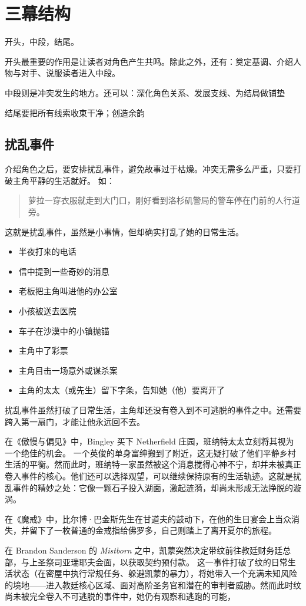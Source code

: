 \documentclass[11pt, twoside, hidelinks]{memoir}
\begin{document}
\section{三幕结构}
\label{sec:orge48fce1}
开头，中段，结尾。

开头最重要的作用是让读者对角色产生共鸣。除此之外，还有：奠定基调、介绍人物与对手、说服读者进入中段。

中段则是冲突发生的地方。还可以：深化角色关系、发展支线、为结局做铺垫

结尾要把所有线索收束干净；创造余韵
\subsection{扰乱事件}
\label{sec:org681e36e}

介绍角色之后，要安排扰乱事件，避免故事过于枯燥。冲突无需多么严重，只要打破主角平静的生活就好。
如：
\begin{quote}
萝拉一穿衣服就走到大门口，刚好看到洛杉矶警局的警车停在门前的人行道旁。
\end{quote}
这就是扰乱事件，虽然是小事情，但却确实打乱了她的日常生活。
\begin{itemize}
\item 半夜打来的电话
\item 信中提到一些奇妙的消息
\item 老板把主角叫进他的办公室
\item 小孩被送去医院
\item 车子在沙漠中的小镇抛锚
\item 主角中了彩票
\item 主角目击一场意外或谋杀案
\item 主角的太太（或先生）留下字条，告知她（他）要离开了
\end{itemize}


扰乱事件虽然打破了日常生活，主角却还没有卷入到不可逃脱的事件之中。还需要跨入第一扇门，才能让他永远回不去。

在《傲慢与偏见》中，Bingley 买下 Netherfield 庄园，班纳特太太立刻将其视为一个绝佳的机会。
一个英俊的单身富绅搬到了附近，这无疑打破了他们平静乡村生活的平衡。然而此时，班纳特一家虽然被这个消息搅得心神不宁，却并未被真正卷入事件的核心。他们还可以选择观望，可以继续保持原有的生活轨迹。这就是扰乱事件的精妙之处：它像一颗石子投入湖面，激起涟漪，却尚未形成无法挣脱的漩涡。

在《魔戒》中，比尔博·巴金斯先生在甘道夫的鼓动下，在他的生日宴会上当众消失，并留下了一枚普通的金戒指给佛罗多，自己则踏上了离开夏尔的旅程。

在 Brandon Sanderson 的 \emph{Mistborn} 之中，凯蒙突然决定带纹前往教廷财务廷总部，与上圣祭司亚瑞耶夫会面，以获取契约预付款。
这一事件打破了纹的日常生活状态（在密屋中执行常规任务、躲避凯蒙的暴力），将她带入一个充满未知风险的境地——进入教廷核心区域、面对高阶圣务官和潜在的审判者威胁。然而此时纹尚未被完全卷入不可逃脱的事件中，她仍有观察和逃跑的可能，
\end{document}
